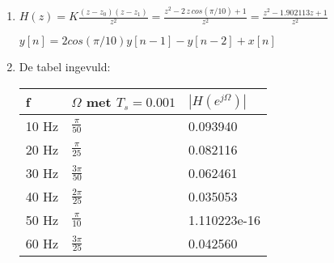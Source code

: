 \documentclass[10pt,a4paper]{article}
\begin{document}
\begin{enumerate}
    \item $ H(z) = K \frac{(z - z_0)(z - z_1)}{z^2}
               = \frac{z^2 - 2\, z \, cos(\pi/10) + 1}{z^2} = \frac{z^2 -
               1.902113z + 1}{z^2} $

    \noindent $ y[n] = 2cos(\pi/10)y[n-1] - y[n-2] + x[n] $

    \item De tabel ingevuld:
    \begin{table}[H] \centering
    \begin{tabular}{|l|l|l|} \hline
    f & $\Omega$ met $T_s = 0.001$ & $|H(e^{j\Omega})|$ \\ \hline
    10 Hz & $ \frac{\pi}{50}$  & 0.093940     \\ \hline
    20 Hz & $ \frac{\pi}{25}$  & 0.082116     \\ \hline
    30 Hz & $ \frac{3\pi}{50}$ & 0.062461     \\ \hline
    40 Hz & $ \frac{2\pi}{25}$ & 0.035053     \\ \hline
    50 Hz & $ \frac{\pi}{10}$  & 1.110223e-16 \\ \hline
    60 Hz & $ \frac{3\pi}{25}$ & 0.042560     \\ \hline
    \end{tabular}
    \end{table}
\end{enumerate}

\end{document}
